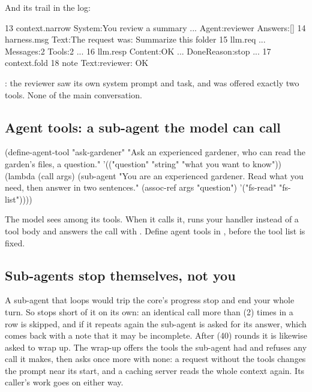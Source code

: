 And its trail in the log:

\begin{txt}
   13 context.narrow  {System:You review a summary ... Agent:reviewer Answers:[]}
   14 harness.msg     {Text:The request was: Summarize this folder}
   15 llm.req         {... Messages:2 Tools:2 ...}
   16 llm.resp        {Content:OK ... DoneReason:stop ...}
   17 context.fold    {}
   18 note            {Text:reviewer: OK}
\end{txt}

: the reviewer saw its own system prompt and task,
and was offered exactly two tools. None of the main conversation.

\subsection{Agent tools: a sub-agent the model can call}

\begin{scm}
(define-agent-tool "ask-gardener"
  "Ask an experienced gardener, who can read the garden's files, a question."
  '(("question" "string" "what you want to know"))
  (lambda (call args)
    (sub-agent "You are an experienced gardener. Read what you need, then answer in two sentences."
               (assoc-ref args "question")
               '("fs-read" "fs-list"))))
\end{scm}

The model sees  among its tools. When it calls it,
 runs your handler instead of a tool body and answers the
call with . Define agent tools in , before
the tool list is fixed.

\subsection{Sub-agents stop themselves, not you}

A sub-agent that loops would trip the core's progress stop and end your
whole turn. So  stops short of it on its own: an identical
call more than  (2) times in a row is skipped,
and if it repeats again the sub-agent is asked for its answer, which comes
back with a note that it may be incomplete. After
 (40) rounds it is likewise asked to wrap up. The
wrap-up offers the tools the sub-agent had and refuses any call it makes,
then asks once more with none: a request without the tools changes the
prompt near its start, and a caching server reads the whole context again.
Its caller's work goes on either way.

